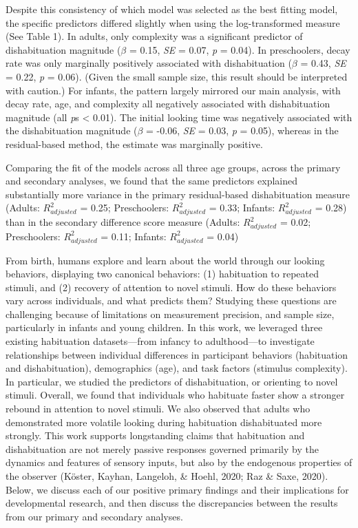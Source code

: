 \documentclass[10pt, letterpaper]{article}
\begin{document}
Despite this consistency of which model was selected as the best fitting
model, the specific predictors differed slightly when using the
log-transformed measure (See Table 1). In adults, only complexity was a
significant predictor of dishabituation magnitude (\(\beta\) = 0.15,
\emph{SE} = 0.07, \emph{p} = 0.04). In preschoolers, decay rate was only
marginally positively associated with dishabituation (\(\beta\) = 0.43,
\emph{SE} = 0.22, \emph{p} = 0.06). (Given the small sample size, this
result should be interpreted with caution.) For infants, the pattern
largely mirrored our main analysis, with decay rate, age, and complexity
all negatively associated with dishabituation magnitude (all \emph{p}s
\textless{} 0.01). The initial looking time was negatively associated
with the dishabituation magnitude (\(\beta\) = -0.06, \emph{SE} = 0.03,
\emph{p} = 0.05), whereas in the residual-based method, the estimate was
marginally positive.

Comparing the fit of the models across all three age groups, across the
primary and secondary analyses, we found that the same predictors
explained substantially more variance in the primary residual-based
dishabituation measure (Adults: \(R^2_{adjusted}\) = 0.25; Preschoolers:
\(R^2_{adjusted}\) = 0.33; Infants: \(R^2_{adjusted}\) = 0.28) than in
the secondary difference score measure (Adults: \(R^2_{adjusted}\) =
0.02; Preschoolers: \(R^2_{adjusted}\) = 0.11; Infants:
\(R^2_{adjusted}\) = 0.04)

From birth, humans explore and learn about the world through our looking
behaviors, displaying two canonical behaviors: (1) habituation to
repeated stimuli, and (2) recovery of attention to novel stimuli. How do
these behaviors vary across individuals, and what predicts them?
Studying these questions are challenging because of limitations on
measurement precision, and sample size, particularly in infants and
young children. In this work, we leveraged three existing habituation
datasets---from infancy to adulthood---to investigate relationships
between individual differences in participant behaviors (habituation and
dishabituation), demographics (age), and task factors (stimulus
complexity). In particular, we studied the predictors of dishabituation,
or orienting to novel stimuli. Overall, we found that individuals who
habituate faster show a stronger rebound in attention to novel stimuli.
We also observed that adults who demonstrated more volatile looking
during habituation dishabituated more strongly. This work supports
longstanding claims that habituation and dishabituation are not merely
passive responses governed primarily by the dynamics and features of
sensory inputs, but also by the endogenous properties of the observer
(Köster, Kayhan, Langeloh, \& Hoehl, 2020; Raz \& Saxe, 2020). Below, we
discuss each of our positive primary findings and their implications for
developmental research, and then discuss the discrepancies between the
results from our primary and secondary analyses.
\end{document}
